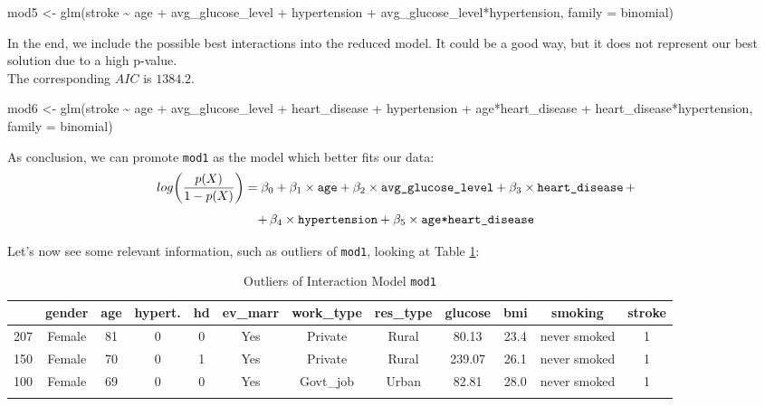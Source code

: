 \documentclass[
]{article}
\newenvironment{Shaded}{\begin{snugshade}}{\end{snugshade}}
\newcommand{\AttributeTok}[1]{\textcolor[rgb]{0.77,0.63,0.00}{#1}}
\newcommand{\FunctionTok}[1]{\textcolor[rgb]{0.00,0.00,0.00}{#1}}
\newcommand{\NormalTok}[1]{#1}
\newcommand{\OtherTok}[1]{\textcolor[rgb]{0.56,0.35,0.01}{#1}}
\newcommand{\SpecialCharTok}[1]{\textcolor[rgb]{0.00,0.00,0.00}{#1}}
\begin{document}
\begin{Shaded}
\begin{Highlighting}[]
\NormalTok{mod5 }\OtherTok{\textless{}{-}} \FunctionTok{glm}\NormalTok{(stroke }\SpecialCharTok{\textasciitilde{}}\NormalTok{ age }\SpecialCharTok{+}\NormalTok{ avg\_glucose\_level }\SpecialCharTok{+}\NormalTok{ hypertension }\SpecialCharTok{+} 
\NormalTok{              avg\_glucose\_level}\SpecialCharTok{*}\NormalTok{hypertension, }\AttributeTok{family =}\NormalTok{ binomial)}
\end{Highlighting}
\end{Shaded}

In the end, we include the possible best interactions into the reduced
model. It could be a good way, but it does not represent our best
solution due to a high p-value.\\
The corresponding \(AIC\) is \(1384.2\).

\begin{Shaded}
\begin{Highlighting}[]
\NormalTok{mod6 }\OtherTok{\textless{}{-}} \FunctionTok{glm}\NormalTok{(stroke }\SpecialCharTok{\textasciitilde{}}\NormalTok{ age }\SpecialCharTok{+}\NormalTok{ avg\_glucose\_level }\SpecialCharTok{+}\NormalTok{ heart\_disease }\SpecialCharTok{+}\NormalTok{ hypertension }\SpecialCharTok{+}
\NormalTok{              age}\SpecialCharTok{*}\NormalTok{heart\_disease }\SpecialCharTok{+}\NormalTok{ heart\_disease}\SpecialCharTok{*}\NormalTok{hypertension, }\AttributeTok{family =}\NormalTok{ binomial)}
\end{Highlighting}
\end{Shaded}

As conclusion, we can promote \texttt{mod1} as the model which better
fits our data:
\[log\bigg(\frac{p(X)}{1-p(X)}\bigg) = \beta_0 + \beta_1\times \verb!age! + \beta_2\times \verb|avg_glucose_level| + \beta_3 \times \verb|heart_disease| \,+ \]
\[+\, \beta_4 \times\verb|hypertension| + \beta_5 \times \verb |age*heart_disease|\]

Let's now see some relevant information, such as outliers of
\texttt{mod1}, looking at Table \ref{outliers_mod1}:

\setlength\LTleft{-.5cm}
\begin{longtable}[]{@{}lccccccccccc@{}}
\toprule
& gender & age & hypert. & hd & ev\_marr & work\_type & res\_type &
glucose & bmi & smoking & stroke \\
\midrule
\endhead
207 & Female & 81 & 0 & 0 & Yes & Private & Rural & 80.13 & 23.4 & never
smoked & 1 \\
150 & Female & 70 & 0 & 1 & Yes & Private & Rural & 239.07 & 26.1 &
never smoked & 1 \\
100 & Female & 69 & 0 & 0 & Yes & Govt\_job & Urban & 82.81 & 28.0 &
never smoked & 1 \\
\bottomrule
\caption{Outliers of Interaction Model \texttt{mod1}}\label{outliers_mod1}
\end{longtable}
\end{document}
